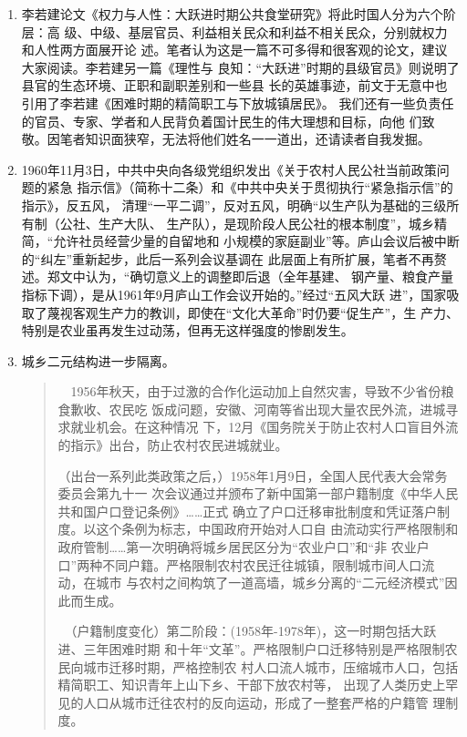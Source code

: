 \begin{enumerate}

\item 李若建论文《权力与人性：大跃进时期公共食堂研究》将此时国人分为六个阶层：高
  级、中级、基层官员、利益相关民众和利益不相关民众，分别就权力和人性两方面展开论
  述。笔者认为这是一篇不可多得和很客观的论文，建议大家阅读。李若建另一篇《理性与
  良知：“大跃进”时期的县级官员》则说明了县官的生态环境、正职和副职差别和一些县
  长的英雄事迹，前文于无意中也引用了李若建《困难时期的精简职工与下放城镇居民》。
  我们还有一些负责任的官员、专家、学者和人民背负着国计民生的伟大理想和目标，向他
  们致敬。因笔者知识面狭窄，无法将他们姓名一一道出，还请读者自我发掘。

\item 1960年11月3日，中共中央向各级党组织发出《关于农村人民公社当前政策问题的紧急
  指示信》（简称十二条）和《中共中央关于贯彻执行``紧急指示信''的指示》，反五风，
  清理``一平二调''，反对五风，明确``以生产队为基础的三级所有制（公社、生产大队、
  生产队），是现阶段人民公社的根本制度''，城乡精简，``允许社员经营少量的自留地和
  小规模的家庭副业''等。庐山会议后被中断的``纠左''重新起步，此后一系列会议基调在
  此层面上有所扩展，笔者不再赘述。郑文中认为，``确切意义上的调整即后退（全年基建、
  钢产量、粮食产量指标下调），是从1961年9月庐山工作会议开始的。''经过``五风大跃
  进''，国家吸取了蔑视客观生产力的教训，即使在``文化大革命''时仍要``促生产''，生
  产力、特别是农业虽再发生过动荡，但再无这样强度的惨剧发生。


\item 城乡二元结构进一步隔离。
  \begin{quotation}
    　1956年秋天，由于过激的合作化运动加上自然灾害，导致不少省份粮食歉收、农民吃
    饭成问题，安徽、河南等省出现大量农民外流，进城寻求就业机会。在这种情况
    下，12月《国务院关于防止农村人口盲目外流的指示》出台，防止农村农民进城就业。

    （出台一系列此类政策之后，）1958年1月9日，全国人民代表大会常务委员会第九十一
    次会议通过并颁布了新中国第一部户籍制度《中华人民共和国户口登记条例》……正式
    确立了户口迁移审批制度和凭证落户制度。以这个条例为标志，中国政府开始对人口自
    由流动实行严格限制和政府管制……第一次明确将城乡居民区分为“农业户口”和“非
    农业户口”两种不同户籍。严格限制农村农民迁往城镇，限制城市间人口流动，在城市
    与农村之间构筑了一道高墙，城乡分离的“二元经济模式”因此而生成。

    　（户籍制度变化）第二阶段：(1958年-1978年)，这一时期包括大跃进、三年困难时期
    和十年“文革”。严格限制户口迁移特别是严格限制农民向城市迁移时期，严格控制农
    村人口流人城市，压缩城市人口，包括精简职工、知识青年上山下乡、干部下放农村等，
    出现了人类历史上罕见的人口从城市迁往农村的反向运动，形成了一整套严格的户籍管
    理制度。\cite{quxiaohuji}
  \end{quotation}


\end{enumerate}
